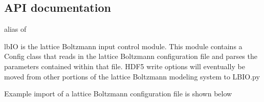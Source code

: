 \documentclass[letterpaper,10pt,english]{sphinxmanual}
\begin{document}
\subsection{API documentation}
\label{\detokenize{index:id5}}\label{\detokenize{index:module-lb_colloids}}

\begin{fulllineitems}
\label{\detokenize{index:lb_colloids.lbIO}}
alias of {\hyperref[\detokenize{index:module-lb_colloids.LB.LBIO}]{}}

\end{fulllineitems}

\label{\detokenize{index:module-lb_colloids.LB.LBIO}}
lbIO is the lattice Boltzmann input control module. This module contains a Config class that
reads in the lattice Boltzmann configuration file and parses the parameters
contained within that file. HDF5 write options will eventually be moved from other
portions of the lattice Boltzmann modeling system to LBIO.py

Example import of a lattice Boltzmann configuration file is shown below

\begin{sphinxVerbatim}[commandchars=\\\{\}]
   
  
  
  
  
  
  
\end{sphinxVerbatim}
\end{document}
